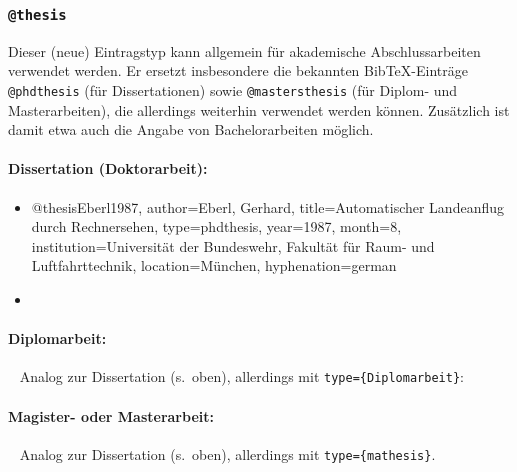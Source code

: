 
\subsubsection{\texttt{@thesis}}
\label{sec:@thesis}
Dieser (neue) Eintragstyp kann allgemein für akademische Abschlussarbeiten verwendet werden. Er ersetzt
insbesondere die bekannten BibTeX-Einträge \texttt{@phdthesis} (für Dissertationen) sowie
\texttt{@mastersthesis} (für Di\-plom- und Masterarbeiten), die allerdings weiterhin verwendet werden können. Zusätzlich ist damit etwa auch die Angabe von Bachelorarbeiten möglich.

\paragraph{Dissertation (Doktorarbeit):}
%
\begin{itemize}
\item[]
\begin{GenericCode}[numbers=none]
@thesis{Eberl1987,
  author={Eberl, Gerhard},
  title={Automatischer Landeanflug durch Rechnersehen},
  type={phdthesis},
  year={1987},
  month={8},
  institution={Universität der Bundeswehr, Fakultät für Raum- und Luftfahrttechnik},
  location={München},
  hyphenation={german}
}
\end{GenericCode}
\item[\cite{Eberl1987}] 
\end{itemize}

\paragraph{Diplomarbeit:} ~ \newline
Analog zur Dissertation (s.\ oben), allerdings mit \texttt{type=\obnh\{Diplomarbeit\}}:%


\paragraph{Magister- oder Masterarbeit:} ~ \newline
Analog zur Dissertation (s.\ oben), allerdings mit \texttt{type=\{mathesis\}}.%

